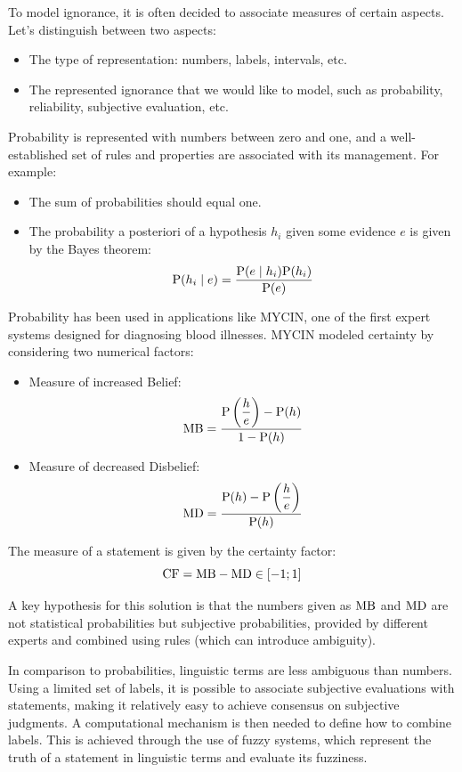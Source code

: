 To model ignorance, it is often decided to associate measures of certain aspects. Let's distinguish between two aspects:
\begin{itemize}
    \item The type of representation: numbers, labels, intervals, etc.
    \item The represented ignorance that we would like to model, such as probability, reliability, subjective evaluation, etc.
\end{itemize}
Probability is represented with numbers between zero and one, and a well-established set of rules and properties are associated with its management. For example:
\begin{itemize}
    \item The sum of probabilities should equal one.
    \item The probability a posteriori of a hypothesis $h_i$ given some evidence $e$ is given by the Bayes theorem:
        \[\textnormal{P}(h_i \mid e)=\dfrac{\textnormal{P}(e \mid h_i)\textnormal{P}(h_i)}{\textnormal{P}(e)}\]
\end{itemize}

Probability has been used in applications like MYCIN, one of the first expert systems designed for diagnosing blood illnesses. 
MYCIN modeled certainty by considering two numerical factors:
\begin{itemize}
    \item Measure of increased Belief: 
        \[\textnormal{MB}=\dfrac{\textnormal{P}\left(\dfrac{h}{e}\right)-\textnormal{P}(h)}{1-\textnormal{P}(h)}\]
    \item Measure of decreased Disbelief: 
        \[\textnormal{MD}=\dfrac{\textnormal{P}(h)-\textnormal{P}\left(\dfrac{h}{e}\right)}{\textnormal{P}(h)}\]
\end{itemize}
The measure of a statement is given by the certainty factor:
\[\textnormal{CF}=\textnormal{MB}-\textnormal{MD} \in [-1;1]\]

A key hypothesis for this solution is that the numbers given as $\textnormal{MB}$ and $\textnormal{MD}$ are not statistical probabilities but subjective probabilities, provided by different experts and combined using rules (which can introduce ambiguity).

In comparison to probabilities, linguistic terms are less ambiguous than numbers. 
Using a limited set of labels, it is possible to associate subjective evaluations with statements, making it relatively easy to achieve consensus on subjective judgments. 
A computational mechanism is then needed to define how to combine labels. 
This is achieved through the use of fuzzy systems, which represent the truth of a statement in linguistic terms and evaluate its fuzziness.